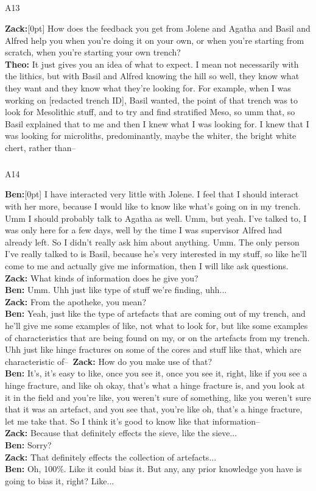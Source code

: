 \documentclass[
]{article}
\makeatletter
\let\oldsubparagraph\subparagraph
\renewcommand{\subparagraph}{
    \@ifstar
      \xxxSubParagraphStar
      \xxxSubParagraphNoStar
  }
\newcommand{\xxxSubParagraphStar}[1]{\oldsubparagraph*{#1}\mbox{}}
\newcommand{\xxxSubParagraphNoStar}[1]{\oldsubparagraph{#1}\mbox{}}
\newcommand{\paragraphnumber}[1]{\marginnote{\color{lightgray}\tiny{#1}}[0pt]}
\makeatother
\begin{document}
\subparagraph{A13}\label{sec-A13}

\textbf{Zack:}\paragraphnumber{[64]} How does the feedback you get from
Jolene and Agatha and Basil and Alfred help you when you're doing it on
your own, or when you're starting from scratch, when you're starting
your own trench?\\
\textbf{Theo:} It just gives you an idea of what to expect. I mean not
necessarily with the lithics, but with Basil and Alfred knowing the hill
so well, they know what they want and they know what they're looking
for. For example, when I was working on {[}redacted trench ID{]}, Basil
wanted, the point of that trench was to look for Mesolithic stuff, and
to try and find stratified Meso, so umm that, so Basil explained that to
me and then I knew what I was looking for. I knew that I was looking for
microliths, predominantly, maybe the whiter, the bright white chert,
rather than--

\subparagraph{A14}\label{sec-A14}

\textbf{Ben:}\paragraphnumber{[65]} I have interacted very little with
Jolene. I feel that I should interact with her more, because I would
like to know like what's going on in my trench. Umm I should probably
talk to Agatha as well. Umm, but yeah. I've talked to, I was only here
for a few days, well by the time I was supervisor Alfred had already
left. So I didn't really ask him about anything. Umm. The only person
I've really talked to is Basil, because he's very interested in my
stuff, so like he'll come to me and actually give me information, then I
will like ask questions.\\
\textbf{Zack:} What kinds of information does he give you?\\
\textbf{Ben:} Umm. Uhh just like type of stuff we're finding, uhh...\\
\textbf{Zack:} From the apotheke, you mean?\\
\textbf{Ben:} Yeah, just like the type of artefacts that are coming out
of my trench, and he'll give me some examples of like, not what to look
for, but like some examples of characteristics that are being found on
my, or on the artefacts from my trench. Uhh just like hinge fractures on
some of the cores and stuff like that, which are characteristic
of--~\textbf{Zack:} How do you make use of that?\\
\textbf{Ben:} It's, it's easy to like, once you see it, once you see it,
right, like if you see a hinge fracture, and like oh okay, that's what a
hinge fracture is, and you look at it in the field and you're like, you
weren't sure of something, like you weren't sure that it was an
artefact, and you see that, you're like oh, that's a hinge fracture, let
me take that. So I think it's good to know like that information--\\
\textbf{Zack:} Because that definitely effects the sieve, like the
sieve...\\
\textbf{Ben:} Sorry?\\
\textbf{Zack:} That definitely effects the collection of artefacts...\\
\textbf{Ben:} Oh, 100\%. Like it could bias it. But any, any prior
knowledge you have is going to bias it, right? Like...
\end{document}
